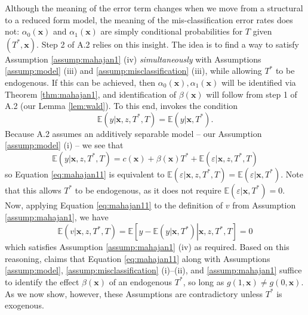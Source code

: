Although the meaning of the error term changes when we move from a structural to a reduced form model, the meaning of the mis-classification error rates does not: $\alpha_0(\mathbf{x})$ and $\alpha_1(\mathbf{x})$ are simply conditional probabilities for $T$ given $(T^*,\mathbf{x})$.
Step 2 of \cite{Mahajan} A.2 relies on this insight.
The idea is to find a way to satisfy Assumption \ref{assump:mahajan1} (iv) \emph{simultaneously} with Assumptions \ref{assump:model} (iii) and \ref{assump:misclassification} (iii), while allowing $T^*$ to be endogenous.
If this can be achieved, then $\alpha_0(\mathbf{x}), \alpha_1(\mathbf{x})$ will be identified via Theorem \ref{thm:mahajan1}, and identification of $\beta(\mathbf{x})$ will follow from step 1 of A.2 (our Lemma \ref{lem:wald}).
To this end, \cite{Mahajan} invokes the condition 
\begin{equation}
  \mathbb{E}(y|\mathbf{x},z,T^*,T) = \mathbb{E}(y|\mathbf{x},T^*).
  \label{eq:mahajan11}
\end{equation}
Because \cite{Mahajan} A.2 assumes an additively separable model -- our Assumption \ref{assump:model} (i) -- we see that
\[
  \mathbb{E}(y|\mathbf{x},z,T^*,T) = c(\mathbf{x}) + \beta(\mathbf{x}) T^* + \mathbb{E}(\varepsilon|\mathbf{x},z,T^*,T)
\]
so Equation \ref{eq:mahajan11} is equivalent to $\mathbb{E}(\varepsilon|\mathbf{x},z,T^*,T)=\mathbb{E}(\varepsilon|\mathbf{x},T^*)$.
Note that this allows $T^*$ to be endogenous, as it does not require $\mathbb{E}(\varepsilon|\mathbf{x},T^*)=0$.
Now, applying Equation \ref{eq:mahajan11} to the definition of $v$ from Assumption \ref{assump:mahajan1}, we have
\[
  \mathbb{E}(v|\mathbf{x},z,T^*,T) = \mathbb{E}\left[ y - \mathbb{E}(y|\mathbf{x},T^*)\left. \right|\mathbf{x},z,T^*,T \right] = 0
\]
which satisfies Assumption \ref{assump:mahajan1} (iv) as required.
Based on this reasoning, \cite{Mahajan} claims that Equation \ref{eq:mahajan11} along with Assumptions \ref{assump:model}, \ref{assump:misclassification} (i)--(ii), and \ref{assump:mahajan1} suffice to identify the effect $\beta(\mathbf{x})$ of an endogenous $T^*$, so long as $g(1,\mathbf{x}) \neq g(0,\mathbf{x})$.
As we now show, however, these Assumptions are contradictory unless $T^*$ is exogenous.

